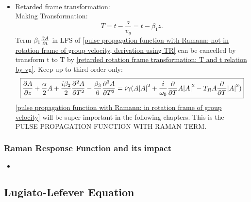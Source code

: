 \documentclass[12pt]{extarticle}
\numberwithin{equation}{section}
\numberwithin{figure}{section}
\numberwithin{table}{section}
\newcommand{\<}{\langle}
\renewcommand{\>}{\rangle}
\theoremstyle{definition}
\begin{document}
\begin{itemize}
\begin{equation}
\begin{split}
                \end{split}
                \label{pulse propagation function with Ramann: not in rotation frame of group velocity, derivation using TR}
                \end{equation}
            \item Retarded frame transformation:\\
                Making Transformation:
                \begin{equation}
                    T = t-\frac{z}{v_g}=t-\beta_1 z
                    \label{retarded rotation frame transformation: T and t relation by vg}.
                \end{equation}
                Term $\beta_1\pdv{A}{t}$ in LFS of \autoref{pulse propagation function with Ramann: not in rotation frame of group velocity, derivation using TR} can be cancelled by transform t to T by \autoref{retarded rotation frame transformation: T and t relation by vg}. Keep up to third order only:
                \begin{equation}
                    \boxed{\pdv{A}{z}+\frac{\alpha}{2}A+\frac{i\beta_2}{2}\pdv[2]{A}{T}-\frac{\beta_3}{6}\pdv[3]{A}{T} = i\gamma(A\abs{A}^2+\frac{i}{\omega_0}\pdv{}{T}A\abs{A}^2-T_R A\pdv{}{T}\abs{A}^2)}
                    \label{pulse propagation function with Ramann: in rotation frame of group velocity}
                \end{equation}
                \autoref{pulse propagation function with Ramann: in rotation frame of group velocity} will be super important in the following chapters. This is the \MakeUppercase{pulse propagation function with Raman term}.
        \end{itemize}

    \subsubsection{Raman Response Function and its impact}
        \begin{itemize}
            \item 
        \end{itemize}
    
    
    
    
    
    
    
    \subsection{Lugiato-Lefever Equation}
\end{document}
